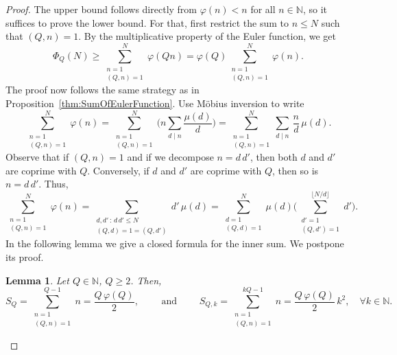 \documentclass[11pt,reqno]{amsart}
\newtheorem{lem}[thm]{Lemma}
\theoremstyle{definition}
\begin{document}
\begin{proof}
The upper bound follows directly from $\varphi(n) < n$ for all $n \in \mathbb N$, 
so it suffices to prove the lower bound. 
For that, 
first restrict the sum to $n \leq N$ such that $(Q,n) = 1$. 
By the multiplicative property of the Euler function, 
we get  
\begin{equation}\label{eq:Phi_Q_Lower_Bound}
\Phi_Q(N) \geq \sum_{\substack{ n=1 \\ (Q,n) = 1  } }^N \varphi(Qn)  =  \varphi(Q) \sum_{\substack{ n=1 \\  (Q,n) = 1  } }^N \varphi(n). 
\end{equation}
The proof now follows the same strategy as in Proposition~\ref{thm:SumOfEulerFunction}. 
Use M\"obius inversion to write
\begin{equation}
\sum_{\substack{ n=1 \\  (Q,n) = 1  } }^N \varphi(n)
= \sum_{\substack{ n=1 \\ (Q,n) = 1  } }^N \Bigg( n \sum_{d \mid n} \frac{\mu(d)}{d} \Bigg)
= \sum_{\substack{ n=1 \\ (Q,n) = 1  } }^N \sum_{d \mid n} \, \frac{n}{d} \,  \mu(d). 
\end{equation}
Observe that if $(Q,n)=1$ and if we decompose $n = d \, d'$, then both $d$ and $d'$ are coprime with $Q$. 
Conversely, if $d$ and $d'$ are coprime with $Q$, then so is $n = d \, d'$. Thus, 
\begin{equation}\label{eq:LowerBoundCoprimes}
\sum_{\substack{ n=1 \\  (Q,n) = 1  } }^N \varphi(n) 
=  \sum_{\substack{ d, d' \, : \, d \, d' \leq N \\  (Q,d) = 1 =  (Q,d')  } } d' \,  \mu(d)
=  \sum_{\substack{ d=1 \\  (Q,d) = 1  } }^N \mu(d)  \Bigg( \sum_{\substack{ d'=1 \\  (Q,d') = 1  } }^{\lfloor N/d \rfloor} d' \Bigg). 
\end{equation}
In the following lemma we give a closed formula  for the inner sum. 
We postpone its proof. 
\begin{lem}\label{thm:LemmaModM1}
Let $Q \in \mathbb N$, $Q \geq 2$. Then, 
\begin{equation}
S_Q = \sum_{\substack{ n = 1 \\ (Q,n) = 1 }}^{Q-1} n = \frac{Q \,  \varphi(Q)}{2},  \qquad \text{ and } \qquad S_{Q,k} = \sum_{\substack{ n = 1 \\ (Q,n) = 1 }}^{kQ - 1} n = \frac{Q \, \varphi(Q)}{2} \, k^2, \quad \forall  k \in \mathbb N.

\end{equation}
\end{lem}
\end{proof}
\end{document}
